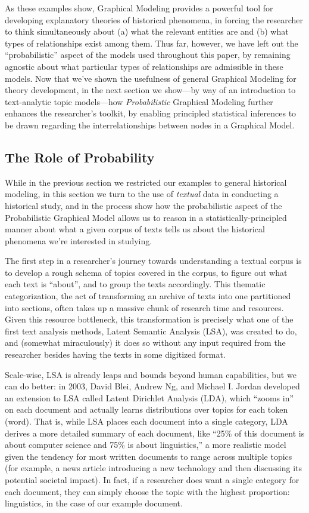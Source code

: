 \documentclass[11pt]{article}
\begin{document}
As these examples show, Graphical Modeling provides a powerful tool for developing explanatory theories of historical phenomena, in forcing the researcher to think simultaneously about (a) what the relevant entities are and (b) what types of relationships exist among them. Thus far, however, we have left out the ``probabilistic'' aspect of the models used throughout this paper, by remaining agnostic about what particular types of relationships are admissible in these models. Now that we've shown the usefulness of general Graphical Modeling for theory development, in the next section we show---by way of an introduction to text-analytic topic models---how \textit{Probabilistic} Graphical Modeling further enhances the researcher's toolkit, by enabling principled statistical inferences to be drawn regarding the interrelationships between nodes in a Graphical Model.

\subsection{The Role of Probability}\label{sec:probability}

While in the previous section we restricted our examples to general historical modeling, in this section we turn to the use of \textit{textual} data in conducting a historical study, and in the process show how the probabilistic aspect of the Probabilistic Graphical Model allows us to reason in a statistically-principled manner about what a given corpus of texts tells us about the historical phenomena we're interested in studying.

The first step in a researcher's journey towards understanding a textual corpus is to develop a rough schema of topics covered in the corpus, to figure out what each text is ``about'', and to group the texts accordingly. This thematic categorization, the act of transforming an archive of texts into one partitioned into sections, often takes up a massive chunk of research time and resources. Given this resource bottleneck, this transformation is precisely what one of the first text analysis methods, Latent Semantic Analysis (LSA), was created to do, and (somewhat miraculously) it does so without any input required from the researcher besides having the texts in some digitized format.

Scale-wise, LSA is already leaps and bounds beyond human capabilities, but we can do better: in 2003, David Blei, Andrew Ng, and Michael I. Jordan developed an extension to LSA called Latent Dirichlet Analysis (LDA), which ``zooms in'' on each document and actually learns distributions over topics for each token (word). That is, while LSA places each document into a single category, LDA derives a more detailed summary of each document, like ``25\% of this document is about computer science and 75\% is about linguistics,'' a more realistic model given the tendency for most written documents to range across multiple topics (for example, a news article introducing a new technology and then discussing its potential societal impact). In fact, if a researcher does want a single category for each document, they can simply choose the topic with the highest proportion: linguistics, in the case of our example document.
\end{document}
